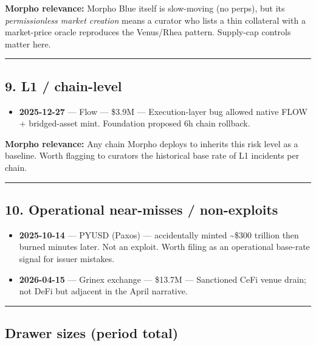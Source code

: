 \textbf{Morpho relevance:} Morpho Blue itself is slow-moving (no perps), but its \emph{permissionless market creation} means a curator who lists a thin collateral with a market-price oracle reproduces the Venus/Rhea pattern. Supply-cap controls matter here.

\begin{center}\rule{0.5\linewidth}{0.5pt}\end{center}

\subsection{9. L1 / chain-level}\label{l1-chain-level}

\begin{itemize}
\tightlist
\item
  \textbf{2025-12-27} --- Flow --- \$3.9M --- Execution-layer bug allowed native FLOW + bridged-asset mint. Foundation proposed 6h chain rollback.
\end{itemize}

\textbf{Morpho relevance:} Any chain Morpho deploys to inherits this risk level as a baseline. Worth flagging to curators the historical base rate of L1 incidents per chain.

\begin{center}\rule{0.5\linewidth}{0.5pt}\end{center}

\subsection{10. Operational near-misses / non-exploits}\label{operational-near-misses-non-exploits}

\begin{itemize}
\tightlist
\item
  \textbf{2025-10-14} --- PYUSD (Paxos) --- accidentally minted \textasciitilde\$300 trillion then burned minutes later. Not an exploit. Worth filing as an operational base-rate signal for issuer mistakes.
\item
  \textbf{2026-04-15} --- Grinex exchange --- \$13.7M --- Sanctioned CeFi venue drain; not DeFi but adjacent in the April narrative.
\end{itemize}

\begin{center}\rule{0.5\linewidth}{0.5pt}\end{center}

\subsection{Drawer sizes (period total)}\label{drawer-sizes-period-total}

